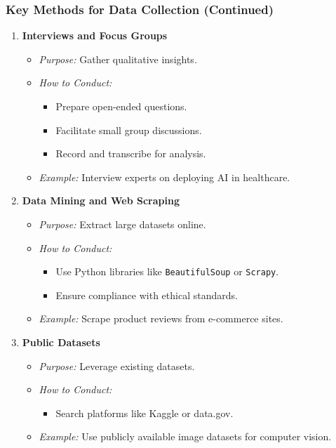 \documentclass[aspectratio=169]{beamer}
\begin{document}
\begin{frame}
    \frametitle{Key Methods for Data Collection (Continued)}
    \begin{enumerate}[resume]
        \item \textbf{Interviews and Focus Groups}
        \begin{itemize}
            \item \textit{Purpose:} Gather qualitative insights.
            \item \textit{How to Conduct:}
            \begin{itemize}
                \item Prepare open-ended questions.
                \item Facilitate small group discussions.
                \item Record and transcribe for analysis.
            \end{itemize}
            \item \textit{Example:} Interview experts on deploying AI in healthcare.
        \end{itemize}

        \item \textbf{Data Mining and Web Scraping}
        \begin{itemize}
            \item \textit{Purpose:} Extract large datasets online.
            \item \textit{How to Conduct:}
            \begin{itemize}
                \item Use Python libraries like \texttt{BeautifulSoup} or \texttt{Scrapy}.
                \item Ensure compliance with ethical standards.
            \end{itemize}
            \item \textit{Example:} Scrape product reviews from e-commerce sites.
        \end{itemize}

        \item \textbf{Public Datasets}
        \begin{itemize}
            \item \textit{Purpose:} Leverage existing datasets.
            \item \textit{How to Conduct:}
            \begin{itemize}
                \item Search platforms like Kaggle or data.gov.
            \end{itemize}
            \item \textit{Example:} Use publicly available image datasets for computer vision.
        \end{itemize}
    \end{enumerate}
\end{frame}
\end{document}
